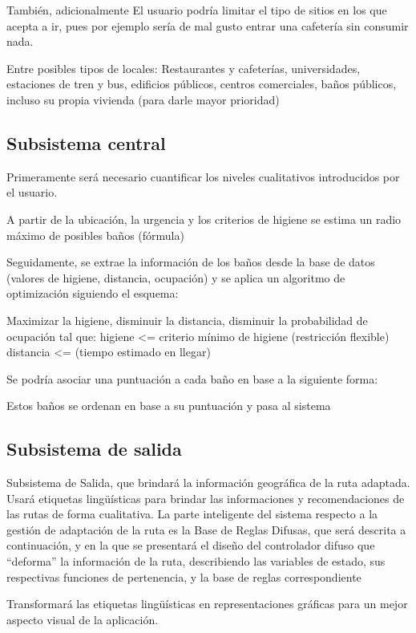 \documentclass[13pt,a4paper]{article}
\begin{document}
También, adicionalmente
El usuario podría limitar el tipo de sitios en los que acepta a ir, pues por ejemplo sería de mal gusto entrar una cafetería sin consumir nada.

Entre posibles tipos de locales: Restaurantes y cafeterías, universidades, estaciones de tren y bus, edificios públicos, centros comerciales, baños públicos, incluso su propia vivienda (para darle mayor prioridad)

\subsection{Subsistema central}

Primeramente será necesario cuantificar los niveles cualitativos introducidos por el usuario.

A partir de la ubicación, la urgencia y los criterios de higiene se estima un radio máximo de posibles baños (fórmula)

Seguidamente, se extrae la información de los baños desde la base de datos (valores de higiene, distancia, ocupación) y se aplica un algoritmo de optimización siguiendo el esquema:

Maximizar la higiene, disminuir la distancia, disminuir la probabilidad de ocupación
tal que:
higiene <= criterio mínimo de higiene (restricción flexible)
distancia <= (tiempo estimado en llegar)

Se podría asociar una puntuación a cada baño en base a la siguiente forma:

Estos baños se ordenan en base a su puntuación y pasa al sistema 

\subsection{Subsistema de salida}

Subsistema de Salida, que brindará la información geográfica de la ruta adaptada. Usará etiquetas lingüísticas para brindar las informaciones y recomendaciones de las rutas de forma cualitativa.
La parte inteligente del sistema respecto a la gestión de adaptación de la ruta es la Base de Reglas Difusas, que será descrita a continuación, y en la que se presentará el diseño del controlador difuso que “deforma” la información de la ruta, describiendo las variables de estado, sus respectivas funciones de pertenencia, y la base de reglas correspondiente

Transformará las etiquetas lingüísticas en representaciones gráficas para un mejor aspecto visual de la aplicación.
\end{document}
